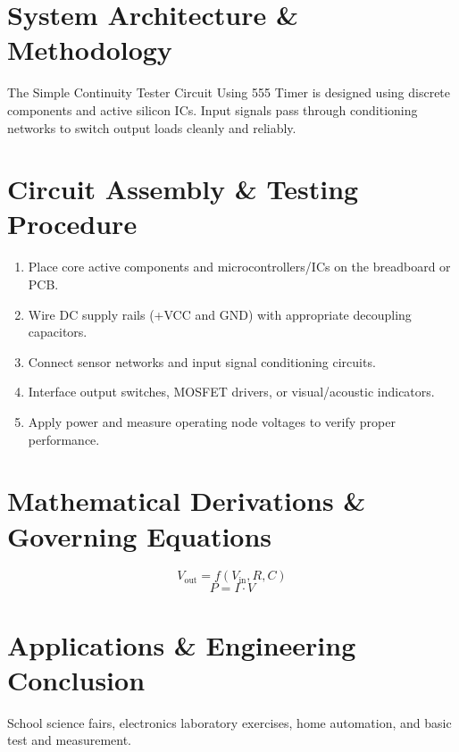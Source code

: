 \documentclass[11pt,a4paper]{article}
\begin{document}
\section{System Architecture \& Methodology}
The Simple Continuity Tester Circuit Using 555 Timer is designed using discrete components and active silicon ICs. Input signals pass through conditioning networks to switch output loads cleanly and reliably.

\section{Circuit Assembly \& Testing Procedure}
\begin{enumerate}
    \item Place core active components and microcontrollers/ICs on the breadboard or PCB.
    \item Wire DC supply rails (+VCC and GND) with appropriate decoupling capacitors.
    \item Connect sensor networks and input signal conditioning circuits.
    \item Interface output switches, MOSFET drivers, or visual/acoustic indicators.
    \item Apply power and measure operating node voltages to verify proper performance.
\end{enumerate}

\section{Mathematical Derivations \& Governing Equations}
\begin{equation}
V_{\text{out}} = f(V_{\text{in}}, R, C)
\end{equation}
\begin{equation}
P = I \cdot V
\end{equation}

\section{Applications \& Engineering Conclusion}
School science fairs, electronics laboratory exercises, home automation, and basic test and measurement.
\end{document}
